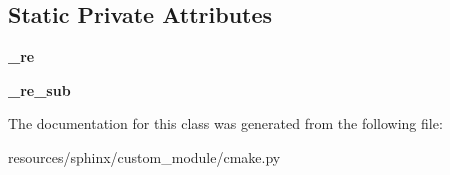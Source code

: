 \subsection*{Static Private Attributes}
\begin{DoxyCompactItemize}
\item 
{\bfseries \+\_\+re}\hypertarget{classcmake_1_1CMakeXRefRole_aac6d8cdf12356ff1d7d8e71f3fc7b6d8}{}\label{classcmake_1_1CMakeXRefRole_aac6d8cdf12356ff1d7d8e71f3fc7b6d8}

\item 
{\bfseries \+\_\+re\+\_\+sub}\hypertarget{classcmake_1_1CMakeXRefRole_abee30c04841f76620a3f43cb01fd55a6}{}\label{classcmake_1_1CMakeXRefRole_abee30c04841f76620a3f43cb01fd55a6}

\end{DoxyCompactItemize}


The documentation for this class was generated from the following file\+:\begin{DoxyCompactItemize}
\item 
resources/sphinx/custom\+\_\+module/cmake.\+py\end{DoxyCompactItemize}
